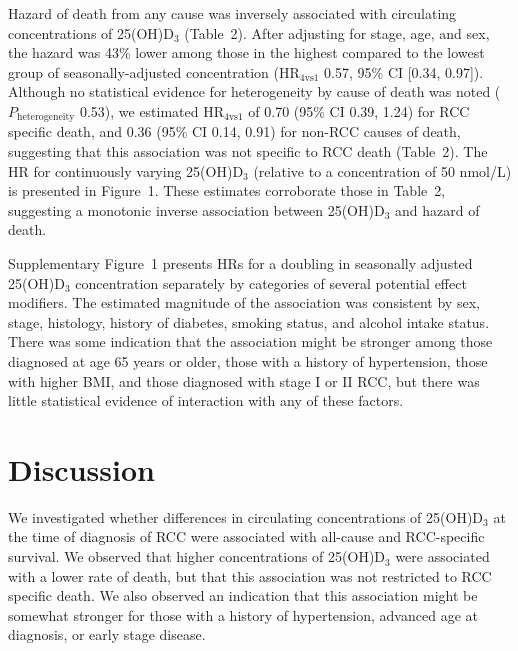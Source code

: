 \documentclass[a4paper,11pt]{article}
\begin{document}
Hazard of death from any cause was inversely associated with 
circulating concentrations of 25(OH)D$_3$ (Table~2). After adjusting for 
stage, age, and sex, the hazard was 43\% lower among those in the highest 
compared to the lowest group of seasonally-adjusted concentration 
(HR$_{4\text{vs}1}$ 0.57, 95\% CI [0.34, 0.97]). Although no statistical 
evidence for heterogeneity by cause of death was noted 
($P_\text{heterogeneity}$ 0.53), we estimated HR$_{4\text{vs}1}$ of 0.70 
(95\% CI 0.39, 1.24) for RCC specific death, and 0.36 (95\% CI 0.14, 0.91) for 
non-RCC causes of death, suggesting that this association was not specific to 
RCC death (Table~2). The HR for continuously varying 25(OH)D$_3$ (relative to a 
concentration of 50 nmol/L) is presented in Figure~1. These estimates 
corroborate those in Table~2, suggesting a monotonic inverse association between 
25(OH)D$_3$ and hazard of death.

Supplementary Figure~1 presents HRs for a doubling in seasonally adjusted 
25(OH)D$_3$ concentration separately by categories of several potential effect 
modifiers. The estimated magnitude of the association was consistent by sex, stage, 
histology, history of diabetes, smoking status, and alcohol intake status. 
There was some indication that the association might be stronger among those 
diagnosed at age 65 years or older, those with a history of hypertension, those 
with higher BMI, and those diagnosed with stage I or II RCC, but there was 
little statistical evidence of interaction with any of these factors. 

\section*{Discussion}
We investigated whether differences in circulating concentrations of 
25(OH)D$_3$ at the time of diagnosis of RCC were associated with all-cause and 
RCC-specific survival. We observed that higher concentrations of 25(OH)D$_3$ 
were associated with a lower rate of death, but that this association was not 
restricted to RCC specific death. We also observed an indication that this 
association might be somewhat stronger for those with a 
history of hypertension, advanced age at diagnosis, or early stage disease.
\end{document}
